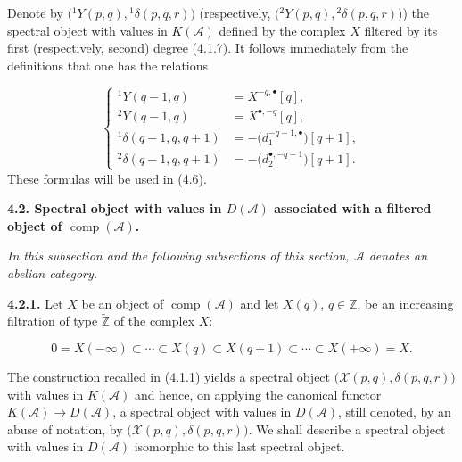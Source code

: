 \clearpage
{}%
\begingroup\small\setlength{\parskip}{0pt}\setlength{\emergencystretch}{1.5em}
\setlength{\abovedisplayskip}{4pt plus 2pt minus 2pt}%
\setlength{\belowdisplayskip}{4pt plus 2pt minus 2pt}%

\noindent Denote by
$\bigl({}^{1}\!Y(p,q),{}^{1}\!\delta(p,q,r)\bigr)$ (respectively,
$\bigl({}^{2}\!Y(p,q),{}^{2}\!\delta(p,q,r)\bigr)$) the spectral object
with values in $K(\mathcal A)$ defined by the complex $X$ filtered by its
first (respectively, second) degree (4.1.7). It follows immediately from
the definitions that one has the relations

\begin{equation}
\left\{
\begin{aligned}
{}^{1}\!Y(q-1,q)&=X^{-q,\bullet}[q],\\
{}^{2}\!Y(q-1,q)&=X^{\bullet,-q}[q],\\
{}^{1}\!\delta(q-1,q,q+1)&=-\bigl(d_1^{-q-1,\bullet}\bigr)[q+1],\\
{}^{2}\!\delta(q-1,q,q+1)&=-\bigl(d_2^{\bullet,-q-1}\bigr)[q+1].
\end{aligned}
\right.
\tag{4.1.9.1}
\end{equation}
These formulas will be used in (4.6).

\medskip\noindent\textbf{4.2. Spectral object with values in
$D(\mathcal A)$ associated with a filtered object of
$\operatorname{comp}(\mathcal A)$.}

\medskip\noindent\emph{In this subsection and the following subsections of
this section, $\mathcal A$ denotes an abelian category.}

\medskip\noindent\textbf{4.2.1.}\quad
Let $X$ be an object of $\operatorname{comp}(\mathcal A)$ and let
$X(q)$, $q\in\mathbb Z$, be an increasing filtration of type
$\widetilde{\mathbb Z}$ of the complex $X$:

\begin{equation}
0=X(-\infty)\subset\cdots\subset X(q)\subset X(q+1)
\subset\cdots\subset X(+\infty)=X.
\tag{4.2.1.1}
\end{equation}

The construction recalled in (4.1.1) yields a spectral object
$\bigl(\mathcal X(p,q),\delta(p,q,r)\bigr)$ with values in
$K(\mathcal A)$ and hence, on applying the canonical functor
$K(\mathcal A)\longrightarrow D(\mathcal A)$, a spectral object with
values in $D(\mathcal A)$, still denoted, by an abuse of notation, by
$\bigl(\mathcal X(p,q),\delta(p,q,r)\bigr)$. We shall describe a spectral
object with values in $D(\mathcal A)$ isomorphic to this last spectral
object.

